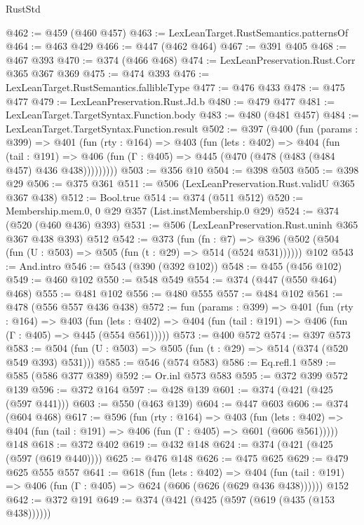 \begin{lexlean}{RustStd}
\begin{coremodule}
@462 := @459 (@460 @457)
@463 := LexLeanTarget.RustSemantics.patternsOf
@464 := @463 @429
@466 := @447 (@462 @464)
@467 := @391 @405
@468 := @467 @393
@470 := @374 (@466 @468)
@474 := LexLeanPreservation.Rust.Corr @365 @367 @369
@475 := @474 @393
@476 := LexLeanTarget.RustSemantics.fallibleType
@477 := @476 @433
@478 := @475 @477
@479 := LexLeanPreservation.Rust.Jd.b
@480 := @479 @477
@481 := LexLeanTarget.TargetSyntax.Function.body
@483 := @480 (@481 @457)
@484 := LexLeanTarget.TargetSyntax.Function.result
@502 := @397
    (@400
      (fun (params : @399) =>
      @401
        (fun (rty : @164) =>
        @403
          (fun (lets : @402) =>
          @404
            (fun (tail : @191) =>
            @406 (fun (Γ : @405) => @445 (@470 (@478 (@483 (@484 @457) @436 @438)))))))))
@503 := @356 @10
@504 := @398 @503
@505 := @398 @29
@506 := @375 @361
@511 := @506 (LexLeanPreservation.Rust.validU @365 @367 @438)
@512 := Bool.true
@514 := @374 (@511 @512)
@520 := Membership.mem.{0, 0} @29 @357 (List.instMembership.{0} @29)
@524 := @374 (@520 (@460 @436) @393)
@531 := @506 (LexLeanPreservation.Rust.uninh @365 @367 @438 @393) @512
@542 := @373
    (fun (fn : @7) =>
    @396 (@502 (@504 (fun (U : @503) => @505 (fun (t : @29) => @514 (@524 @531))))))
    @102
@543 := And.intro
@546 := @543 (@390 (@392 @102))
@548 := @455 (@456 @102)
@549 := @460 @102
@550 := @548 @549
@554 := @374 (@447 (@550 @464) @468)
@555 := @481 @102
@556 := @480 @555
@557 := @484 @102
@561 := @478 (@556 @557 @436 @438)
@572 := fun (params : @399) =>
  @401
    (fun (rty : @164) =>
    @403
      (fun (lets : @402) => @404 (fun (tail : @191) => @406 (fun (Γ : @405) => @445 (@554 @561)))))
@573 := @400 @572
@574 := @397 @573
@583 := @504 (fun (U : @503) => @505 (fun (t : @29) => @514 (@374 (@520 @549 @393) @531)))
@585 := @546 (@574 @583)
@586 := Eq.refl.{1}
@589 := @585 (@586 @377 @389)
@592 := Or.inl @573 @583
@595 := @372 @399 @572 @139
@596 := @372 @164
@597 := @428 @139
@601 := @374 (@421 (@425 (@597 @441)))
@603 := @550 (@463 @139)
@604 := @447 @603
@606 := @374 (@604 @468)
@617 := @596
    (fun (rty : @164) =>
    @403
      (fun (lets : @402) => @404 (fun (tail : @191) => @406 (fun (Γ : @405) => @601 (@606 @561)))))
    @148
@618 := @372 @402
@619 := @432 @148
@624 := @374 (@421 (@425 (@597 (@619 @440))))
@625 := @476 @148
@626 := @475 @625
@629 := @479 @625 @555 @557
@641 := @618
    (fun (lets : @402) =>
    @404 (fun (tail : @191) => @406 (fun (Γ : @405) => @624 (@606 (@626 (@629 @436 @438))))))
    @152
@642 := @372 @191
@649 := @374 (@421 (@425 (@597 (@619 (@435 (@153 @438))))))

\end{coremodule}
\end{lexlean}
